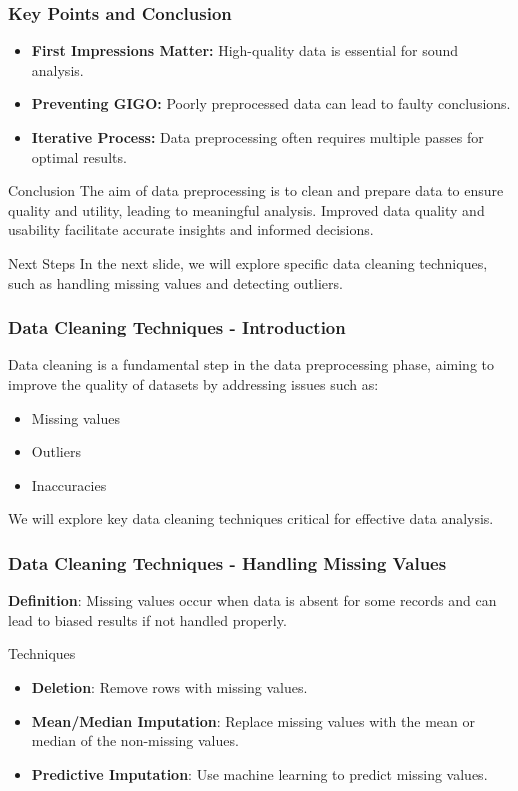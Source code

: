 \documentclass[aspectratio=169]{beamer}
\begin{document}
\begin{frame}[fragile]
    \frametitle{Key Points and Conclusion}
    \begin{itemize}
        \item \textbf{First Impressions Matter:} High-quality data is essential for sound analysis.
        \item \textbf{Preventing GIGO:} Poorly preprocessed data can lead to faulty conclusions.
        \item \textbf{Iterative Process:} Data preprocessing often requires multiple passes for optimal results.
    \end{itemize}
    
    \begin{block}{Conclusion}
        The aim of data preprocessing is to clean and prepare data to ensure quality and utility, leading to meaningful analysis. 
        Improved data quality and usability facilitate accurate insights and informed decisions.
    \end{block}

    \begin{block}{Next Steps}
        In the next slide, we will explore specific data cleaning techniques, such as handling missing values and detecting outliers.
    \end{block}
\end{frame}

\begin{frame}[fragile]
    \frametitle{Data Cleaning Techniques - Introduction}
    Data cleaning is a fundamental step in the data preprocessing phase, 
    aiming to improve the quality of datasets by addressing issues such as:
    \begin{itemize}
        \item Missing values
        \item Outliers
        \item Inaccuracies
    \end{itemize}
    We will explore key data cleaning techniques critical for effective data analysis.
\end{frame}

\begin{frame}[fragile]
    \frametitle{Data Cleaning Techniques - Handling Missing Values}
    \textbf{Definition}: Missing values occur when data is absent for some records and can lead to biased results if not handled properly.

    \begin{block}{Techniques}
        \begin{itemize}
            \item \textbf{Deletion}: Remove rows with missing values.
            \item \textbf{Mean/Median Imputation}: Replace missing values with the mean or median of the non-missing values.
            \item \textbf{Predictive Imputation}: Use machine learning to predict missing values.
        \end{itemize}
    \end{block}
\end{frame}
\end{document}
